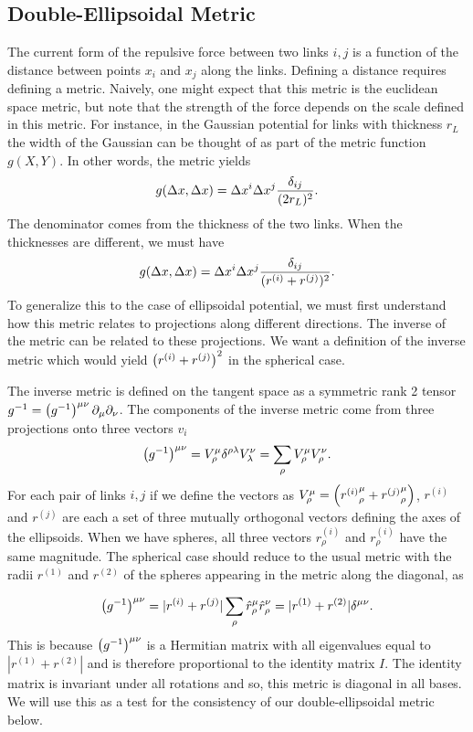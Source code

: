 \documentclass[linenumbers,endfloats,nofootinbib,preprint,floatfix,titlepage,superscriptaddress]{revtex4-1} %
\begin{document}
\subsection{Double-Ellipsoidal Metric }
The current form of the repulsive force between two links $i,j$ is a function of the distance between points $x_i$ and $x_j$ along the links. 
Defining a distance requires defining a metric. 
Naively, one might expect that this metric is the euclidean space metric, but note that the strength of the force depends on the scale defined in this metric. 
For instance, in the Gaussian potential for links with thickness $r_L$ the width of the Gaussian can be thought of as part of the metric function $g(X,Y)$. 
In other words, the metric yields
\[g(\Delta x, \Delta x) = \Delta x^i \Delta x^j {\delta_{ij} \over (2 r_L)^2}.  \]
The denominator comes from the thickness of the two links. When the thicknesses are different, we must have
\[g(\Delta x, \Delta x) = \Delta x^i \Delta x^j {\delta_{ij} \over ( r^{(i)} +r^{(j)})^2}.  \]
To generalize this to the case of ellipsoidal potential, we must first understand how this metric relates to projections along different directions. 
The inverse of the metric can be related to these projections. 
We want a definition of the inverse metric which would yield $\left(r^{(i)} +r^{(j)}\right)^2$ in the spherical case. 

The inverse metric is defined on the tangent space as a symmetric rank 2 tensor $ g^{-1} = \left(g^{-1}\right)^{\mu\nu}\partial_\mu \partial_\nu $. 
The components of the inverse metric  come from three projections onto three vectors $v_i$
\begin{equation}
    \left(g^{-1}\right)^{\mu\nu} = V^\mu_\rho \delta^{\rho \lambda} V^\nu_\lambda =  \sum_{\rho} V_\rho^\mu V_\rho^\nu. \label{eq:ginv}
\end{equation}
For each pair of links $i,j$ if we define the vectors as $V_\rho^\mu =%
\pr{{r^{(i)}}_{\rho}^\mu+{r^{(j)}}_{\rho}^\mu} $, 
$r^{(i)}$ and $r^{(j)}$ are each a set of three mutually orthogonal vectors defining the axes of the ellipsoids. 
When we have spheres, all three vectors $r^{(i)}_\rho$ and $r^{(i)}_\rho$ have the same magnitude. 
The spherical case should reduce to the usual metric with the radii $r^{(1)}$ and $r^{(2)}$ of the spheres appearing in the metric along the diagonal, as 

$$ \left(g^{-1}\right)^{\mu\nu} = |r^{(i)}+r^{(j)}|\sum_{\rho} \hat{r}_\rho^\mu \hat{r}_\rho^\nu = |r^{(1)}+r^{(2)}| \delta^{\mu\nu }.$$
This is because $ \left(g^{-1}\right)^{\mu\nu} $ is a Hermitian matrix with all eigenvalues equal to $|r^{(1)}+r^{(2)}|$ and is therefore proportional to the identity matrix $I$. The identity matrix is invariant under all rotations and so, this metric is diagonal in all bases.
We will use this as a test for the consistency of our double-ellipsoidal metric below. 
 
\end{document}
